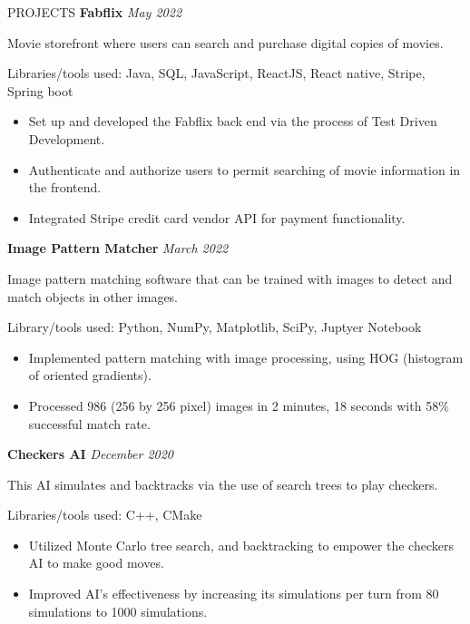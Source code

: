 \documentclass{ResumeFormat} %
\begin{document}
\begin{rSection}{PROJECTS}
\textbf{Fabflix} {} \hfill {\emph{May 2022}} %

Movie storefront where users can search and purchase digital copies of movies.

Libraries/tools used: Java, SQL, JavaScript, ReactJS, React native, Stripe, Spring boot
\begin{itemize}
    \itemsep -3pt {}
     \item Set up and developed the Fabflix back end via the process of Test Driven Development.
     \item Authenticate and authorize users to permit searching of movie information in the frontend.
     \item Integrated Stripe credit card vendor API for payment functionality.
\end{itemize}
\vspace{0.5em}

\textbf{Image Pattern Matcher} {} \hfill {\emph{March 2022}}

Image pattern matching software that can be trained with images to detect and match objects in other images.

Library/tools used: Python, NumPy, Matplotlib, SciPy, Juptyer Notebook
\begin{itemize}
    \itemsep -3pt {} 
     \item Implemented pattern matching with image processing, using HOG (histogram of oriented gradients).
     \item Processed 986 (256 by 256 pixel) images in 2 minutes, 18 seconds with 58\% successful match rate.
\end{itemize}
\vspace{0.5em}

\textbf{Checkers AI} {} \hfill {\emph{December 2020}}

This AI simulates and backtracks via the use of search trees to play checkers.

Libraries/tools used: C++, CMake
\begin{itemize}
    \itemsep -3pt {}
     \item Utilized Monte Carlo tree search, and backtracking to empower the checkers AI to make good moves.
     \item Improved AI's effectiveness by increasing its simulations per turn from 80 simulations to 1000 simulations.
\end{itemize}
\vspace{0.5em}


\end{rSection}
\end{document}
